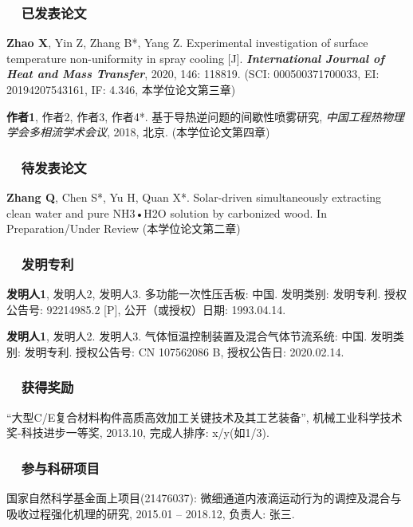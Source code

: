 \begin{achievements}

\newcommand{\achievementsubsection}[1]{%
\subsubsection*{\textbf{~~#1}}%
    \vspace{-10pt}
\selectfont
}

\achievementsubsection{已发表论文}
\begin{enumerate}[label={[\arabic*]},itemsep=0pt,topsep=0pt,itemindent=0pt]
\item\textbf{Zhao X}, Yin Z, Zhang B*, Yang Z. Experimental investigation of surface temperature non-uniformity in spray cooling [J]. \textbf{\textsl{International Journal of Heat and Mass Transfer}}, 2020, 146: 118819. (SCI: 000500371700033, EI: 20194207543161, IF: 4.346, 本学位论文第三章) 
\item\textbf{作者1}, 作者2, 作者3, 作者4*. 基于导热逆问题的间歇性喷雾研究, \textit{中国工程热物理学会多相流学术会议}, 2018, 北京. (本学位论文第四章)
\end{enumerate}

\medskip{}

\achievementsubsection{待发表论文}
\begin{enumerate}[label={[\arabic*]},itemsep=0pt,topsep=0pt,itemindent=0pt]
\item\textbf{Zhang Q}, Chen S*, Yu H, Quan X*. Solar-driven simultaneously extracting clean water and pure NH3•H2O solution by carbonized wood. In Preparation/Under Review (本学位论文第二章)
\end{enumerate}

\medskip{}

\achievementsubsection{发明专利}
\begin{enumerate}[label={[\arabic*]},itemsep=0pt,topsep=0pt,itemindent=0pt]
\item\textbf{发明人1}, 发明人2, 发明人3. 多功能一次性压舌板: 中国. 发明类别: 发明专利. 授权公告号: 92214985.2 [P], 公开（或授权）日期: 1993.04.14.
\item\textbf{发明人1}, 发明人2. 发明人3. 气体恒温控制装置及混合气体节流系统: 中国. 发明类别: 发明专利. 授权公告号: CN 107562086 B, 授权公告日: 2020.02.14.
\end{enumerate}	

\medskip{}

\achievementsubsection{获得奖励}
\begin{enumerate}[label={[\arabic*]},itemsep=0pt,topsep=0pt,itemindent=0pt]
\item “大型C/E复合材料构件高质高效加工关键技术及其工艺装备”, 机械工业科学技术奖-科技进步一等奖, 2013.10, 完成人排序: x/y(如1/3).
\end{enumerate}

\medskip{}

\achievementsubsection{参与科研项目}
\begin{enumerate}[label={[\arabic*]},itemsep=0pt,topsep=0pt,itemindent=0pt]
\item 国家自然科学基金面上项目(21476037): 微细通道内液滴运动行为的调控及混合与吸收过程强化机理的研究, 2015.01 – 2018.12, 负责人: 张三.
\end{enumerate}

\end{achievements}
